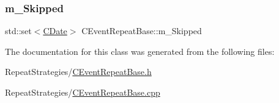\subsubsection{\texorpdfstring{m\+\_\+\+Skipped}{m\_Skipped}}
{\footnotesize\ttfamily std\+::set$<$\mbox{\hyperlink{class_c_date}{C\+Date}}$>$ C\+Event\+Repeat\+Base\+::m\+\_\+\+Skipped}



The documentation for this class was generated from the following files\+:\begin{DoxyCompactItemize}
\item 
Repeat\+Strategies/\mbox{\hyperlink{_c_event_repeat_base_8h}{C\+Event\+Repeat\+Base.\+h}}\item 
Repeat\+Strategies/\mbox{\hyperlink{_c_event_repeat_base_8cpp}{C\+Event\+Repeat\+Base.\+cpp}}\end{DoxyCompactItemize}
